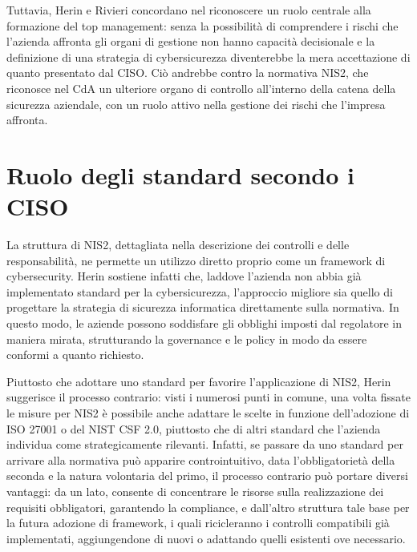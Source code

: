 Tuttavia, Herin e Rivieri concordano nel riconoscere un ruolo centrale alla formazione del top management:
senza la possibilità di comprendere i rischi che l'azienda affronta gli organi di gestione non hanno
capacità decisionale e la definizione di una strategia di cybersicurezza diventerebbe la mera accettazione
di quanto presentato dal CISO. Ciò andrebbe contro la normativa NIS2, che riconosce nel CdA un ulteriore
organo di controllo all'interno della catena della sicurezza aziendale, con un ruolo attivo 
nella gestione dei rischi che l'impresa affronta. 



\section{Ruolo degli standard secondo i CISO}
La struttura di NIS2, dettagliata nella descrizione dei controlli e delle responsabilità,
ne permette un utilizzo diretto proprio come un framework di cybersecurity.
Herin sostiene infatti che, laddove l'azienda non abbia già implementato standard
per la cybersicurezza, l'approccio migliore sia quello di progettare la strategia
di sicurezza informatica direttamente sulla normativa. In questo modo, le aziende 
possono soddisfare gli obblighi imposti dal regolatore in maniera mirata, 
strutturando la governance e le policy in modo da essere conformi a quanto richiesto. 

Piuttosto che adottare uno standard per favorire l'applicazione di NIS2, Herin suggerisce
il processo contrario: visti i numerosi punti in comune, una volta fissate le misure
per NIS2 è possibile anche adattare le scelte in funzione dell'adozione di ISO 27001 o del NIST CSF 2.0,
piuttosto che di altri standard che l'azienda individua come strategicamente rilevanti.
Infatti, se passare da uno standard per arrivare alla normativa può apparire controintuitivo,
data l'obbligatorietà della seconda e la natura volontaria del primo, il processo contrario
può portare diversi vantaggi: da un lato, consente di concentrare le risorse sulla realizzazione dei
requisiti obbligatori, garantendo la compliance, e dall'altro struttura tale base per la futura
adozione di framework, i quali ricicleranno i controlli compatibili già implementati, 
aggiungendone di nuovi o adattando quelli esistenti ove necessario.

